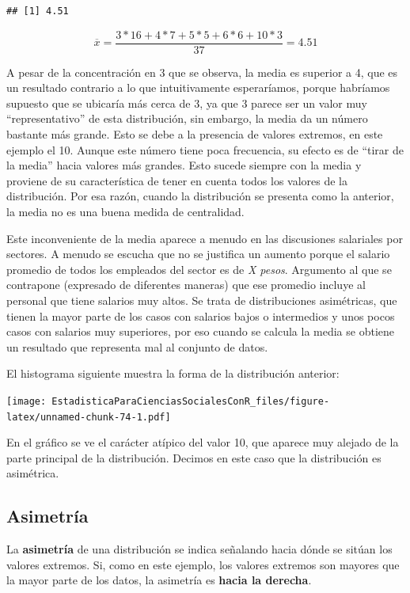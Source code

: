\documentclass[]{book}
\begin{document}
\begin{verbatim}
## [1] 4.51
\end{verbatim}

\[\overline{x} = \frac{3*16 + 4*7 + 5*5 + 6*6 + 10*3}{37} = 4.51\]

A pesar de la concentración en 3 que se observa, la media es superior a 4, que es un resultado contrario a lo que intuitivamente esperaríamos,
porque habríamos supuesto que se ubicaría más cerca de 3, ya que 3
parece ser un valor muy ``representativo'' de esta distribución, sin
embargo, la media da un número bastante más grande. Esto se debe a la
presencia de valores extremos, en este ejemplo el 10. Aunque este número
tiene poca frecuencia, su efecto es de ``tirar de la media'' hacia valores
más grandes. Esto sucede siempre con la media y proviene de su
característica de tener en cuenta todos los valores de la distribución.
Por esa razón, cuando la distribución se presenta como la anterior, la
media no es una buena medida de centralidad.

Este inconveniente de la media aparece a menudo en las discusiones
salariales por sectores. A menudo se escucha que no se justifica un
aumento porque el salario promedio de todos los empleados del sector es
de \emph{X pesos}. Argumento al que se contrapone (expresado de diferentes
maneras) que ese promedio incluye al personal que tiene salarios muy
altos. Se trata de distribuciones asimétricas, que tienen la mayor parte
de los casos con salarios bajos o intermedios y unos pocos casos con
salarios muy superiores, por eso cuando se calcula la media se obtiene
un resultado que representa mal al conjunto de datos.

El histograma siguiente muestra la forma de la distribución anterior:

\texttt{[image: EstadisticaParaCienciasSocialesConR\_files/figure-latex/unnamed-chunk-74-1.pdf]}

En el gráfico se ve el carácter atípico del valor 10, que aparece muy
alejado de la parte principal de la distribución. Decimos en este caso
que la distribución es asimétrica.

\hypertarget{asimetruxeda}{%
\subsection{Asimetría}\label{asimetruxeda}}

La \textbf{asimetría} de una distribución se indica señalando hacia dónde se
sitúan los valores extremos. Si, como en este ejemplo, los valores
extremos son mayores que la mayor parte de los datos, la asimetría es
\textbf{hacia la derecha}.
\end{document}
